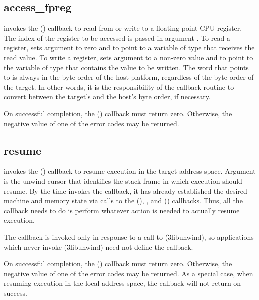 \documentclass{article}
\begin{document}
\subsection{access\_fpreg}

 invokes the () callback to read
from or write to a floating-point CPU register.  The index of the
register to be accessed is passed in argument .  To read a
register,  sets argument  to zero and
 to point to a variable of type  that
receives the read value.  To write a register,  sets
argument  to a non-zero value and  to point to
the variable of type  that contains the value to
be written.  The word that  points to is always in the
byte order of the host platform, regardless of the byte order of the
target.  In other words, it is the responsibility of the callback
routine to convert between the target's and the host's byte order, if
necessary.

On successful completion, the () callback must
return zero.  Otherwise, the negative value of one of the
 error codes may be returned.

\subsection{resume}

 invokes the () callback to resume
execution in the target address space.  Argument  is the
unwind cursor that identifies the stack frame in which execution
should resume.  By the time  invokes the 
callback, it has already established the desired machine and
memory state via calls to the (),
, and () callbacks.  Thus, all
the callback needs to do is perform whatever action is needed to
actually resume execution.

The  callback is invoked only in response to a call to
(3libunwind), so applications which never invoke
(3libunwind) need not define the  callback.

On successful completion, the () callback must return
zero.  Otherwise, the negative value of one of the
 error codes may be returned.  As a special case,
when resuming execution in the local address space, the callback will
not return on success.
\end{document}
